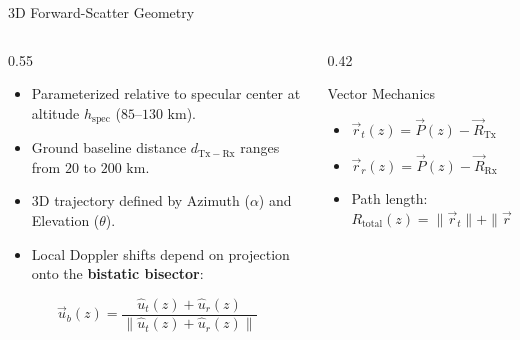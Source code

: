 \documentclass[aspectratio=169, 10pt]{beamer}
\begin{document}
\begin{frame}{3D Forward-Scatter Geometry}
    \begin{columns}
        \begin{column}{0.55\textwidth}
            \begin{itemize}
                \item Parameterized relative to specular center at altitude $h_{\mathrm{spec}}$ ($85\text{--}130\text{ km}$).
                \item Ground baseline distance $d_{\mathrm{Tx-Rx}}$ ranges from $20\text{ to }200\text{ km}$.
                \item 3D trajectory defined by Azimuth ($\alpha$) and Elevation ($\theta$).
                \item Local Doppler shifts depend on projection onto the \textbf{bistatic bisector}:
            \end{itemize}
            \begin{equation*}
                \vec{u}_b(z) = \frac{\hat{u}_t(z) + \hat{u}_r(z)}{\|\hat{u}_t(z) + \hat{u}_r(z)\|}
            \end{equation*}
        \end{column}
        \begin{column}{0.42\textwidth}
            \begin{block}{Vector Mechanics}
                \begin{itemize}
                    \item $\vec{r}_t(z) = \vec{P}(z) - \vec{R}_{\mathrm{Tx}}$
                    \item $\vec{r}_r(z) = \vec{P}(z) - \vec{R}_{\mathrm{Rx}}$
                    \item Path length: $R_{\mathrm{total}}(z) = \|\vec{r}_t\| + \|\vec{r}_r\|$
                \end{itemize}
            \end{block}
        \end{column}
    \end{columns}
\end{frame}
\end{document}
